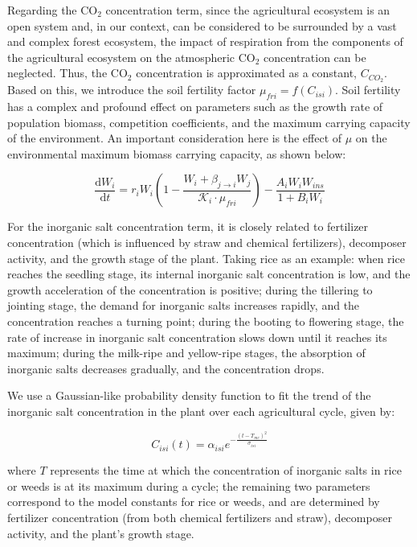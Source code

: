 \documentclass{HZNUMCM}
\begin{document}
        Regarding the CO$_2$ concentration term, 
        since the agricultural ecosystem is an open system and, 
        in our context, can be considered to be surrounded by a vast and complex forest ecosystem, 
        the impact of respiration from the components of the agricultural ecosystem on the atmospheric CO$_2$ concentration can be neglected. 
        Thus, the CO$_2$ concentration is approximated as a constant, \( C_{CO_2} \). 
        Based on this, we introduce the soil fertility factor \( \mu_{fri} = f(C_{isi}) \). 
        Soil fertility has a complex and profound effect on parameters such as the growth rate of population biomass, 
        competition coefficients, and the maximum carrying capacity of the environment. 
        An important consideration here is the effect of \( \mu \) on the environmental maximum biomass carrying capacity, 
        as shown below:

        \[
        \frac{\mathrm{d}W_{i}}{\mathrm{d}t} = r_{i} W_{i} \left( 1 - \frac{W_{i} + \beta_{j \rightarrow i} W_{j}}{\mathscr{K}_{i} \cdot \mu_{fri}} \right) - \frac{A_{i} W_{i} W_{ins}}{1 + B_{i} W_{i}}
        \]

        For the inorganic salt concentration term, 
        it is closely related to fertilizer concentration (which is influenced by straw and chemical fertilizers), 
        decomposer activity, and the growth stage of the plant. Taking rice as an example: when rice reaches the seedling stage, 
        its internal inorganic salt concentration is low, and the growth acceleration of the concentration is positive; 
        during the tillering to jointing stage, the demand for inorganic salts increases rapidly, and the concentration reaches a turning point; 
        during the booting to flowering stage, the rate of increase in inorganic salt concentration slows down until it reaches its maximum; 
        during the milk-ripe and yellow-ripe stages, the absorption of inorganic salts decreases gradually, and the concentration drops.\cite{garcia2003logistic}
        
        We use a Gaussian-like probability density function to fit the trend of the inorganic salt concentration in the plant over each agricultural cycle, given by:
        
        \[
        C_{isi}(t) = \alpha_{isi} e^{-\frac{(t - T_{mc})^2}{\sigma_{isi}}}
        \]

        where \( T \) represents the time at which the concentration of inorganic salts in rice or weeds is at its maximum during a cycle; the remaining two parameters correspond to the model constants for rice or weeds, and are determined by fertilizer concentration (from both chemical fertilizers and straw), decomposer activity, and the plant’s growth stage.
\end{document}
